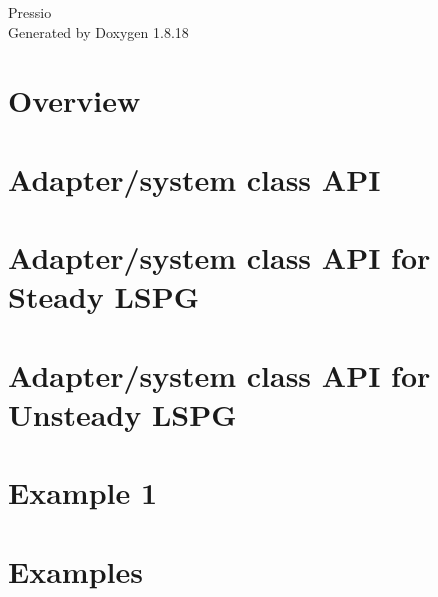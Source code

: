 \let\mypdfximage\pdfximage\def\pdfximage{\immediate\mypdfximage}\documentclass[twoside]{book}
\newcommand{\+}{\discretionary{\mbox{\scriptsize$\hookleftarrow$}}{}{}}
\newcommand{\clearemptydoublepage}{%
  \newpage{\pagestyle{empty}\cleardoublepage}%
}
\begin{document}
\hypersetup{pageanchor=false,
             bookmarksnumbered=true,
             pdfencoding=unicode
            }
\begin{titlepage}
\vspace*{7cm}
\begin{center}%
{\Large Pressio }\\
\vspace*{1cm}
{\large Generated by Doxygen 1.8.18}\\
\end{center}
\end{titlepage}
\clearemptydoublepage
{}
\tableofcontents
\clearemptydoublepage
{}
\hypersetup{pageanchor=true}

\chapter{Overview}
\label{index}\hypertarget{index}{}
\chapter{Adapter/system class A\+PI}
\label{md_pages_adapter_api}

\chapter{Adapter/system class A\+PI for Steady L\+S\+PG}
\label{md_pages_adapter_apis_adapter_steady_lspg_api}

\chapter{Adapter/system class A\+PI for Unsteady L\+S\+PG}
\label{md_pages_adapter_apis_adapter_unsteady_lspg_api}

\chapter{Example 1}
\label{md_pages_examples_example1}

\chapter{Examples}
\label{md_pages_examples}

\end{document}
